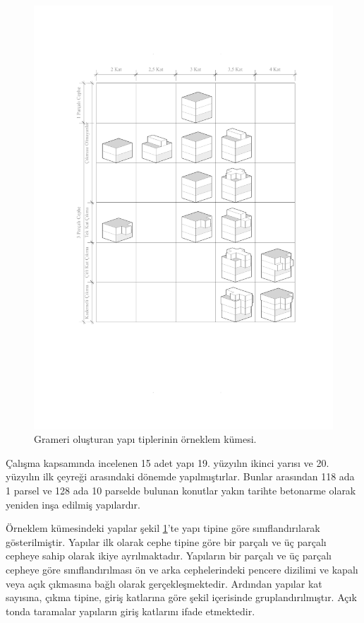 \documentclass[12pt,turkish,a4paperpaper,]{report}
\begin{document}
\begin{figure}
\centering
\includegraphics[width=1\textwidth,height=\textheight]{source/figures/Corpus.pdf}
\caption{Grameri oluşturan yapı tiplerinin örneklem kümesi.
\label{orneklemkumesi}}
\end{figure}

Çalışma kapsamında incelenen 15 adet yapı 19. yüzyılın ikinci yarısı ve
20. yüzyılın ilk çeyreği arasındaki dönemde yapılmıştırlar. Bunlar
arasından 118 ada 1 parsel ve 128 ada 10 parselde bulunan konutlar yakın
tarihte betonarme olarak yeniden inşa edilmiş yapılardır.

Örneklem kümesindeki yapılar şekil \ref{orneklemkumesi}'te yapı tipine
göre sınıflandırılarak gösterilmiştir. Yapılar ilk olarak cephe tipine
göre bir parçalı ve üç parçalı cepheye sahip olarak ikiye ayrılmaktadır.
Yapıların bir parçalı ve üç parçalı cepheye göre sınıflandırılması ön ve
arka cephelerindeki pencere dizilimi ve kapalı veya açık çıkmasına bağlı
olarak gerçekleşmektedir. Ardından yapılar kat sayısına, çıkma tipine,
giriş katlarına göre şekil içerisinde gruplandırılmıştır. Açık tonda
taramalar yapıların giriş katlarını ifade etmektedir.
\end{document}

